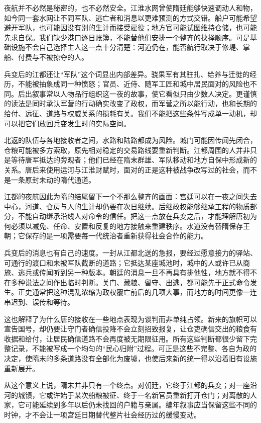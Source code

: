 夜航并不必然是秘密的，也不必然安全。江淮水网曾使隋廷能够快速调动人和物，如今同一套水网让不同军队、逃亡者和消息以更难预测的方式交错。船户可能希望避开军队，也可能因没有别的生计而接受雇役；地方官可能试图维持仓储，也可能先求自保。我们缺少港口逐日账簿，不能替他们安排一个整齐的抉择顺序。可是基础设施不会自己选择主人这一点十分清楚：河道仍在，能否航行取决于修堤、掌船、付费与不被掠夺的人。

兵变后的江都还让“军队”这个词显出内部差异。骁果军有其驻扎、给养与迁徙的经历，不能被抽象成同一种愤怒；官员、近侍、随军工匠和城中居民面对的风险也不同。后出叙事常以人物品行组织这一夜的故事，使它看似只由少数人决定。更谨慎的读法是同时承认军营的行动确实改变了政权，而军营之所以能行动，也和长期的给付、远征、道路与权威关系的损耗有关。我们不能把这些条件写成单一动机，却可以把它们放回兵变发生时的实际空间。

北返的队伍与各地接收者之间，水路和陆路都成为风险。城门可能因传闻先闭合，仓粮可能被多方索取，原先相对稳定的交易路线要重新判断。江都周围的人并非只是等待唐军抵达的旁观者；他们已经在隋末群雄、军队移动和地方自保中形成新的关系。唐后来使用运河与江淮财赋时，面对的正是这种被战争改写过的社会，而不是一条原封未动的隋代通道。

江都的夜航因此为隋的结尾留下一个不那么整齐的画面：宫廷可以在一夜之间失去中心，河道、仓房与人的生计却仍要在次日继续。后继政权能够继承工程的物质部分，不能自动继承沿线人对命令的信任。把这一点放在兵变之后，才能理解唐初为何必须以减免、任命、安置和反复的地方接触来重建秩序。水道没有替隋保存王朝；它保存的是一项需要每一代统治者重新获得社会合作的能力。

兵变后的消息也有自己的速度。一封从江都北送的急报，要经过愿意接力的驿站、可通行的渡口和未被军队截断的道路；它抵达某座城池时，城中的人或许已从商旅、逃兵或传闻听到另一种版本。朝廷的消息一旦不再具有排他性，地方就不得不在多种说法之间作出临时判断。关门、藏粮、留守、出逃，都可能先于正式命令发生。正史通常把这种混乱浓缩为政权覆亡前后的几项大事，而地方的时间更像一连串迟到、误传和等待。

这也解释了为什么唐的接收在一些地点表现为谈判而非单纯占领。新来的旗帜可以宣告国号，却仍要让守门者确信投降不会立刻招致报复，让仓吏确信交出的粮食有收据和给付，让居民确信道路不会再度被无期限征用。所有这些判断都很少留下完整记录，不能被写成一个均匀的“民心归附”过程。可正是这些不完整、各自为政的决定，使隋末的多条道路没有全部化为废墟，也使后来新的统一得以沿着旧有设施重新展开。

从这个意义上说，隋末并非只有一个终点。对朝廷，它终于江都的兵变；对一座沿河的城镇，它或许始于某次船粮被征、终于一名新官员重新打开仓门；对离散的人家，它可能延续到多年以后仍未找回的户籍与亲属。编年叙事应当保留这些不同的时钟，才不会让一项宫廷日期替代整片社会经历过的缓慢变动。

